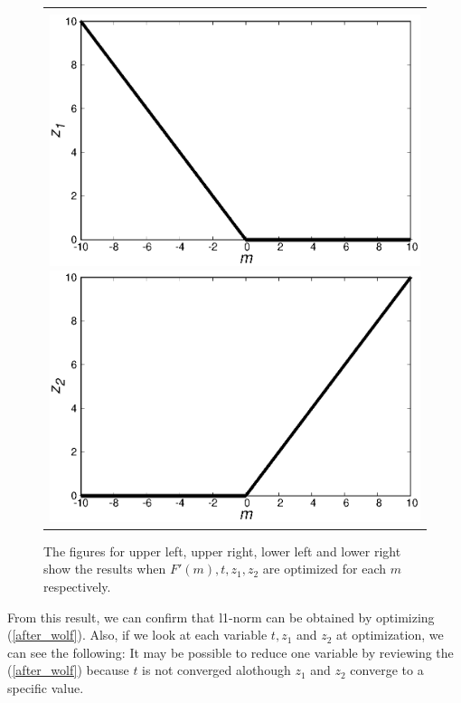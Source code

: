\documentclass[fp,twocolumn]{jpsj3}
\begin{document}
\begin{figure}[htbp]
\begin{center}
\begin{tabular}{c}
\begin{minipage}{0.50\hsize}
      \end{minipage} \\
      \begin{minipage}{0.50\hsize}
        \centering
        \includegraphics[keepaspectratio,scale=0.33]{minimum_z1.eps}
      \end{minipage}
      \begin{minipage}{0.50\hsize}
        \centering
        \includegraphics[keepaspectratio,scale=0.33]{minimum_z2.eps}
      \end{minipage}
    \end{tabular}
    \caption{The figures for upper left, upper right, lower left and lower right show the results when $F'(m), t, z_{1}, z_{2}$ are optimized for each $m$ respectively.}
    \label{fig:minimum1}
  \end{center}
\end{figure}
From this result, we can confirm that l1-norm can be obtained by optimizing (\ref{after_wolf}). Also, if we look at each variable $t, z_{1}$ and $z_{2}$ at optimization, we can see the following: It may be possible to reduce one variable by reviewing the (\ref{after_wolf}) because $t$ is not converged alothough $z_{1}$ and $z_{2}$ converge to a specific value.
\end{document}
